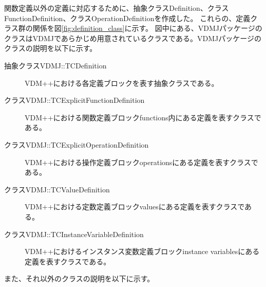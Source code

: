 \documentclass[uplatex, report, a4j, 10pt]{jsbook}
\begin{document}
関数定義以外の定義に対応するために、抽象クラスDefinition、クラスFunctionDefinition、クラスOperationDefinitionを作成した。
これらの、定義クラス群の関係を図\ref{fig:definition_class}に示す。
図中にある、VDMJパッケージのクラスはVDMJであらかじめ用意されているクラスである。VDMJパッケージのクラスの説明を以下に示す。

\begin{description}
  \item[抽象クラスVDMJ::TCDefinition] VDM++における各定義ブロックを表す抽象クラスである。
  \item[クラスVDMJ::TCExplicitFunctionDefinition] VDM++における関数定義ブロックfunctions内にある定義を表すクラスである。
  \item[クラスVDMJ::TCExplicitOperationDefinition] VDM++における操作定義ブロックoperationsにある定義を表すクラスである。
  \item[クラスVDMJ::TCValueDefinition] VDM++における定数定義ブロックvaluesにある定義を表すクラスである。
  \item[クラスVDMJ::TCInstanceVariableDefinition] VDM++におけるインスタンス変数定義ブロックinstance variablesにある定義を表すクラスである。
\end{description}

また、それ以外のクラスの説明を以下に示す。
\end{document}
